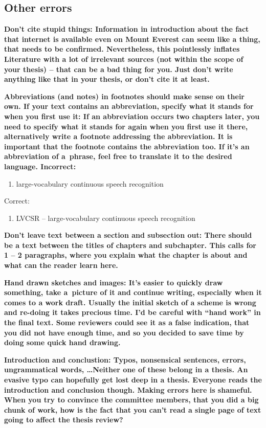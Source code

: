 {{\subsection*{Other errors}

\bf Don't cite stupid things: \rm Information in introduction about the fact that internet is available even on Mount Everest can seem like a thing, that needs to be confirmed. Nevertheless, this pointlessly inflates Literature with a lot of irrelevant sources (not within the scope of your thesis) -- that can be a bad thing for you. Just don't write anything like that in your thesis, or don't cite it at least.

\bf Abbreviations (and notes) in footnotes should make sense on their own. If your text contains an abbreviation, specify what it stands for when you first use it: \rm If an abbreviation occurs two chapters later, you need to specify what it stands for again when you first use it there, alternatively write a footnote addressing the abbreviation. It is important that the footnote contains the abbreviation too. If it's an abbreviation of a~phrase, feel free to translate it to the desired language.
Incorrect:
\begin{enumerate}
  \item{large-vocabulary continuous speech recognition}
\end{enumerate}
Correct:
\begin{enumerate}
  \item{LVCSR -- large-vocabulary continuous speech recognition}
\end{enumerate}

\bf Don't leave text between a section and subsection out: \rm There should be a text between the titles of chapters and subchapter. This calls for 1 -- 2 paragraphs, where you explain what the chapter is about and what can the reader learn here.

\bf Hand drawn sketches and images: \rm It's easier to quickly draw something, take a~picture of it and continue writing, especially when it comes to a work draft. Usually the initial sketch of a scheme is wrong and re-doing it takes precious time. I'd be careful with ``hand work'' in the final text. Some reviewers could see it as a false indication, that you did not have enough time, and so you decided to save time by doing some quick hand drawing.

\bf Introduction and conclustion: \rm Typos, nonsensical sentences, errors, ungrammatical words, \ldots Neither one of these belong in a thesis. An evasive typo can hopefully get lost deep in a thesis. Everyone reads the introduction and conclusion though. Making errors here is shameful. When you try to convince the committee members, that you did a big chunk of work, how is the fact that you can't read a single page of text going to affect the thesis review?

}}
